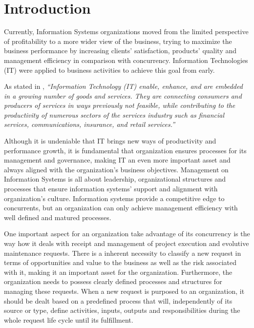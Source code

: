 
% 
% 

\section{Introduction}


Currently, Information Systems organizations moved from the limited perspective of profitability to a more wider view of the business, trying to maximize the business performance by increasing clients' satisfaction, products' quality and management efficiency in comparison with concurrency. Information Technologies (IT) were applied to business activities to achieve this goal from early.\par 
As stated in \cite{itilSS}, \textit{``Information Technology (IT) enable, enhance, and are embedded in a growing number of goods and services. They are connecting consumers and producers of services in ways previously not feasible, while contributing to the productivity of numerous sectors of the services industry such as financial services, communications, insurance, and retail services.''}\par
Although it is undeniable that IT brings new ways of productivity and performance growth, it is fundamental that organization ensures processes for its management and governance, making IT an even more important asset and always aligned with the organization's business objectives. Management on Information Systems is all about leadership, organizational structures and processes that ensure information systems' support and alignment with organization's culture. Information systems provide a competitive edge to concurrents, but an organization can only achieve management efficiency with well defined and matured processes.\par
One important aspect for an organization take advantage of its concurrency is the way how it deals with receipt and management of project execution and evolutive maintenance requests. There is a inherent necessity to classify a new request in terms of opportunities  and value to the business as well as the risk associated with it, making it an important asset for the organization. Furthermore, the organization needs to possess clearly defined processes and structures for managing these requests. When a new request is purposed to an organization, it should be dealt based on a predefined process that will, independently of its source or type, define activities, inputs, outputs and responsibilities during the whole request life cycle until its fulfillment. \par
